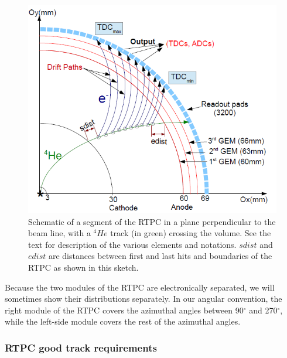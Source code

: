 \begin{figure}[tbp]
\centering
\vspace{-0.1in}
\includegraphics[scale=0.38]{fig_rtpc/RTPC_track.png}
\vspace{-0.1in}
\caption{Schematic of a segment of the RTPC in a plane perpendicular to the 
beam line, with a $^4He$ track (in green) crossing the volume. See the text for 
description of the various elements and notations. $sdist$ and $edist$ are 
distances between first and last hits and boundaries of the RTPC as shown in 
this sketch.} \label{fig:RTPC_track}
\end{figure}

Because the two modules of the RTPC are electronically separated, we will 
sometimes show their distributions separately. In our angular convention, the 
right module of the RTPC covers the azimuthal angles between 90$^{\circ}$ and 
270$^{\circ}$, while the left-side module covers the rest of the azimuthal 
angles. 

\subsubsection{RTPC good track requirements} \label{good_track_req}


